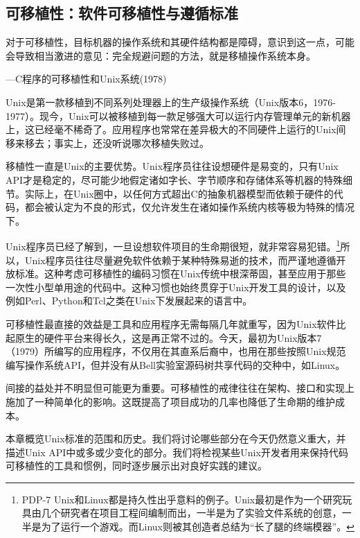\documentclass[12pt,oneside]{book}
\begin{document}
\begin{common-format}
\chapter{可移植性：软件可移植性与遵循标准}
\begin{flushright}
\begin{notecard}{30em}
对于可移植性，目标机器的操作系统和其硬件结构都是障碍，意识到这一点，可能会导致相当激进的意见：完全规避问题的方法，就是移植操作系统本身。

{\hfill —C程序的可移植性和Unix系统(1978)}
\end{notecard}
\end{flushright}


Unix是第一款移植到不同系列处理器上的生产级操作系统（Unix版本6，1976-1977）。现今，Unix可以被移植到每一款足够强大可以运行内存管理单元的新机器上，这已经毫不稀奇了。应用程序也常常在差异极大的不同硬件上运行的Unix间移来移去；事实上，还没听说哪次移植失败过。

移植性一直是Unix的主要优势。Unix程序员往往设想硬件是易变的，只有Unix API才是稳定的，尽可能少地假定诸如字长、字节顺序和存储体系等机器的特殊细节。实际上，在Unix圈中，以任何方式超出C的抽象机器模型而依赖于硬件的代码，都会被认定为不良的形式，仅允许发生在诸如操作系统内核等极为特殊的情况下。

Unix程序员已经了解到，一旦设想软件项目的生命期很短，就非常容易犯错。\footnote{PDP-7 Unix和Linux都是持久性出乎意料的例子。Unix最初是作为一个研究玩具由几个研究者在项目工程间编制而出，一半是为了实验文件系统的创意，一半是为了运行一个游戏。而Linux则被其创造者总结为“长了腿的终端模器”\cite{Torvalds}。}所以，Unix程序员往往尽量避免软件依赖于某种特殊易逝的技术，而严谨地遵循开放标准。这种考虑可移植性的编码习惯在Unix传统中根深蒂固，甚至应用于那些一次性小型单用途的代码中。这种习惯也始终贯穿于Unix开发工具的设计，以及例如Perl、Python和Tcl之类在Unix下发展起来的语言中。

可移植性最直接的效益是工具和应用程序无需每隔几年就重写，因为Unix软件比起原生的硬件平台来得长久，这是再正常不过的。今天，最初为Unix版本7（1979）所编写的应用程序，不仅用在其直系后裔中，也用在那些按照Unix规范编写操作系统API，但并没有从Bell实验室源码树共享代码的交种中，如Linux。

间接的益处并不明显但可能更为重要。可移植性的戒律往往在架构、接口和实现上施加了一种简单化的影响。这既提高了项目成功的几率也降低了生命期的维护成本。

本章概览Unix标准的范围和历史。我们将讨论哪些部分在今天仍然意义重大，并描述Unix API中或多或少变化的部分。我们将检视某些Unix开发者用来保持代码可移植性的工具和惯例，同时逐步展示出对良好实践的建议。


\end{common-format}
\end{document}

